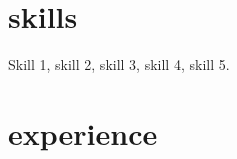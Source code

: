 \documentclass[]{cv-style}          %
\begin{document}

\section{skills}
  \vspace{-0.2cm}

Skill 1, skill 2, skill 3, skill 4, skill 5.


\section{experience}
\end{document}
